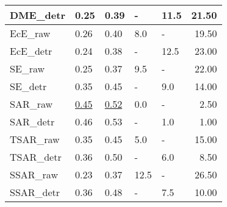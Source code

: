 \begin{tabular}{lllllr}
DME\_detr & 0.25 & 0.39 & - & 11.5 & 21.50 \\
\midrule
EcE\_raw & 0.26 & 0.40 & 8.0 & - & 19.50 \\
EcE\_detr & 0.24 & 0.38 & - & 12.5 & 23.00 \\
\midrule
SE\_raw & 0.25 & 0.37 & 9.5 & - & 22.00 \\
SE\_detr & 0.35 & 0.45 & - & 9.0 & 14.00 \\
\midrule
SAR\_raw & \underline{0.45} & \underline{0.52} & 0.0 & - & 2.50 \\
SAR\_detr & 0.46 & 0.53 & - & 1.0 & 1.00 \\
\midrule
TSAR\_raw & 0.35 & 0.45 & 5.0 & - & 15.00 \\
TSAR\_detr & 0.36 & 0.50 & - & 6.0 & 8.50 \\
\midrule
SSAR\_raw & 0.23 & 0.37 & 12.5 & - & 26.50 \\
SSAR\_detr & 0.36 & 0.48 & - & 7.5 & 10.00 \\
\midrule
\bottomrule
\end{tabular}
\midrule
